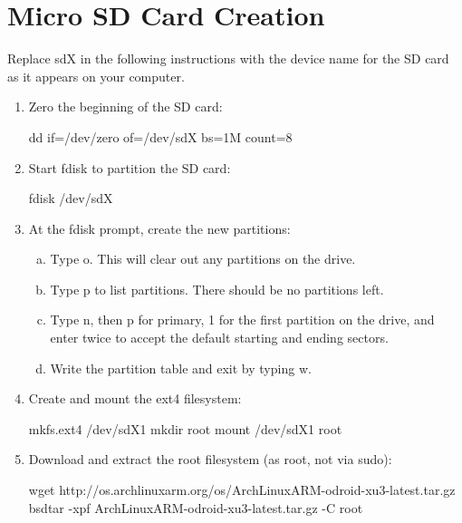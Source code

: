 \section{Micro SD Card Creation}

Replace sdX in the following instructions with the device name for the SD card as it appears on your computer.

\begin{enumerate}

\item Zero the beginning of the SD card:

\begin{bashcode}
dd if=/dev/zero of=/dev/sdX bs=1M count=8
\end{bashcode}


\item Start fdisk to partition the SD card:

\begin{bashcode}
fdisk /dev/sdX
\end{bashcode}
 

\item At the fdisk prompt, create the new partitions:
	\begin{enumerate}[a.]
		        \item Type o. This will clear out any partitions on the drive.
		        \item Type p to list partitions. There should be no partitions left.
		        \item Type n, then p for primary, 1 for the first partition on the drive, and enter twice to accept the default starting and ending sectors.
		        \item Write the partition table and exit by typing w.
	\end{enumerate}
\item Create and mount the ext4 filesystem:

\begin{bashcode}
mkfs.ext4 /dev/sdX1
mkdir root
mount /dev/sdX1 root
\end{bashcode}


\item Download and extract the root filesystem (as root, not via sudo):

\begin{bashcode}
wget http://os.archlinuxarm.org/os/ArchLinuxARM-odroid-xu3-latest.tar.gz
bsdtar -xpf ArchLinuxARM-odroid-xu3-latest.tar.gz -C root
\end{bashcode}


\end{enumerate}
